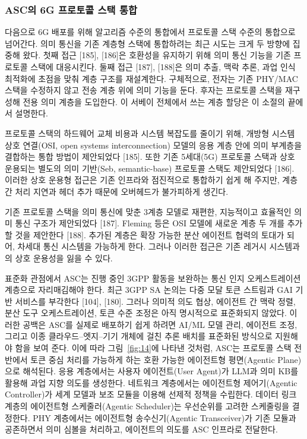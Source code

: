 \subsubsection{ASC의 6G 프로토콜 스택 통합}
다음으로 6G 배포를 위해 알고리즘 수준의 통합에서 프로토콜 스택 수준의 통합으로 넘어간다. 의미 통신을 기존 계층형 스택에 통합하려는 최근 시도는 크게 두 방향에 집중해 왔다. 첫째 접근 [185], [186]은 호환성을 유지하기 위해 의미 통신 기능을 기존 프로토콜 스택에 대응시킨다. 둘째 접근 [187], [188]은 의미 추출, 맥락 추론, 과업 인식 최적화에 초점을 맞춰 계층 구조를 재설계한다. 구체적으로, 전자는 기존 PHY/MAC 스택을 수정하지 않고 전송 계층 위에 의미 기능을 둔다. 후자는 프로토콜 스택을 재구성해 전용 의미 계층을 도입한다. 이 서베이 전체에서 쓰는 계층 할당은 이 소절의 끝에서 설명한다.

프로토콜 스택의 하드웨어 교체 비용과 시스템 복잡도를 줄이기 위해, 개방형 시스템 상호 연결(OSI, open systems interconnection) 모델의 응용 계층 안에 의미 부계층을 결합하는 통합 방법이 제안되었다 [185]. 또한 기존 5세대(5G) 프로토콜 스택과 상호 운용되는 별도의 의미 기반(Seb, semantic-base) 프로토콜 스택도 제안되었다 [186]. 이러한 상호 운용형 접근은 기존 인프라와 점진적으로 통합하기 쉽게 해 주지만, 계층 간 처리 지연과 헤더 추가 때문에 오버헤드가 불가피하게 생긴다.

기존 프로토콜 스택을 의미 통신에 맞춘 3계층 모델로 재편한, 지능적이고 효율적인 의미 통신 구조가 제안되었다 [187]. Fleming 등은 OSI 모델에 새로운 계층 두 개를 추가할 것을 제안한다 [188]. 추가된 계층은 확장 가능한 분산 에이전트 협력의 토대가 되어, 차세대 통신 시스템을 가능하게 한다. 그러나 이러한 접근은 기존 레거시 시스템과의 상호 운용성을 잃을 수 있다.

표준화 관점에서 ASC는 진행 중인 3GPP 활동을 보완하는 통신 인지 오케스트레이션 계층으로 자리매김해야 한다. 최근 3GPP SA 논의는 다중 모달 토큰 스트림과 GAI 기반 서비스를 부각한다 [104], [180]. 그러나 의미적 의도 협상, 에이전트 간 맥락 정렬, 분산 도구 오케스트레이션, 토큰 수준 조정은 아직 명시적으로 표준화되지 않았다. 이러한 공백은 ASC를 실제로 배포하기 쉽게 하려면 AI/ML 모델 관리, 에이전트 조정, 그리고 이종 클라우드--엣지--기기 개체에 걸친 추론 배치를 표준화된 방식으로 지원해야 함을 보여 준다. 이에 따라 그림~\ref{fig:14}에 나타낸 것처럼, ASC는 프로토콜 스택 전반에서 토큰 중심 처리를 가능하게 하는 호환 가능한 에이전트형 평면(Agentic Plane)으로 해석된다. 응용 계층에서는 사용자 에이전트(User Agent)가 LLM과 의미 KB를 활용해 과업 지향 의도를 생성한다. 네트워크 계층에서는 에이전트형 제어기(Agentic Controller)가 세계 모델과 보조 모듈을 이용해 선제적 정책을 수립한다. 데이터 링크 계층의 에이전트형 스케줄러(Agentic Scheduler)는 우선순위를 고려한 스케줄링을 결정한다. PHY 계층에서는 에이전트형 송수신기(Agentic Transceiver)가 기존 모듈과 공존하면서 의미 심볼을 처리하고, 에이전트의 의도를 ASC 인프라로 전달한다.

